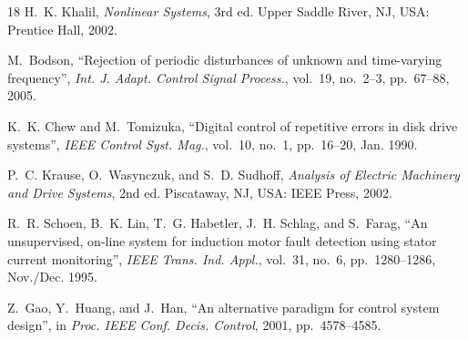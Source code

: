 \documentclass[journal]{IEEEtran}
\theoremstyle{remark}
\newcommand{\qq}[1]{\textquotedblleft#1\textquotedblright}
\begin{document}
\begin{thebibliography}{18}
H.~K. Khalil, \emph{Nonlinear Systems}, 3rd ed. Upper Saddle River, NJ, USA:
Prentice Hall, 2002.

M.~Bodson, \qq{Rejection of periodic disturbances of unknown and time-varying
frequency}, \emph{Int. J. Adapt. Control Signal Process.}, vol.~19, no.~2--3,
pp.~67--88, 2005.

K.~K. Chew and M.~Tomizuka, \qq{Digital control of repetitive errors in disk drive
systems}, \emph{IEEE Control Syst. Mag.}, vol.~10, no.~1, pp.~16--20, Jan. 1990.

P.~C. Krause, O.~Wasynczuk, and S.~D. Sudhoff, \emph{Analysis of Electric Machinery
and Drive Systems}, 2nd ed. Piscataway, NJ, USA: IEEE Press, 2002.

R.~R. Schoen, B.~K. Lin, T.~G. Habetler, J.~H. Schlag, and S.~Farag,
\qq{An unsupervised, on-line system for induction motor fault detection using stator
current monitoring}, \emph{IEEE Trans. Ind. Appl.}, vol.~31, no.~6, pp.~1280--1286,
Nov./Dec. 1995.

Z.~Gao, Y.~Huang, and J.~Han, \qq{An alternative paradigm for control system design},
in \emph{Proc. IEEE Conf. Decis. Control}, 2001, pp.~4578--4585.
\end{thebibliography}
\end{document}
